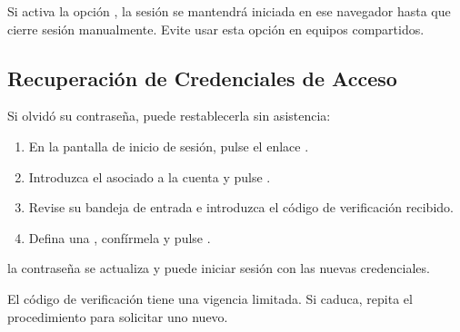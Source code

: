 \begin{AvisoNota}
Si activa la opción , la sesión se mantendrá iniciada en ese
navegador hasta que cierre sesión manualmente. Evite usar esta opción en equipos
compartidos.
\end{AvisoNota}

\subsection{Recuperación de Credenciales de Acceso}
\label{subsec:recuperacion}

Si olvidó su contraseña, puede restablecerla sin asistencia:

\begin{enumerate}[noitemsep]
    \item En la pantalla de inicio de sesión, pulse el enlace
    .
    \item Introduzca el  asociado a la cuenta y pulse
    .
    \item Revise su bandeja de entrada e introduzca el código de verificación recibido.
    \item Defina una , confírmela y pulse
    .
\end{enumerate}

 la contraseña se actualiza y puede iniciar sesión con
las nuevas credenciales.

\begin{AvisoPrecaucion}
El código de verificación tiene una vigencia limitada. Si caduca, repita el
procedimiento para solicitar uno nuevo.
\end{AvisoPrecaucion}
